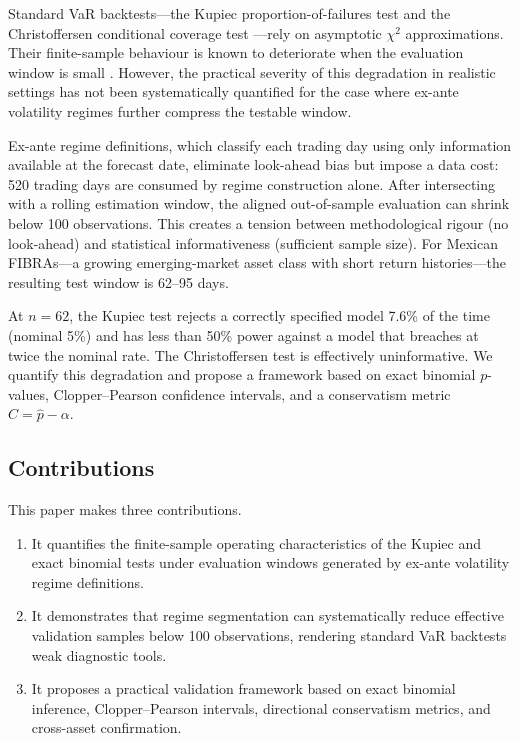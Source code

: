 \documentclass[12pt,a4paper]{article}
\begin{document}
Standard VaR backtests---the Kupiec proportion-of-failures test \cite{kupiec1995techniques} and the Christoffersen conditional coverage test \cite{christoffersen1998evaluating}---rely on asymptotic $\chi^2$ approximations. Their finite-sample behaviour is known to deteriorate when the evaluation window is small \cite{escanciano2010backtesting}. However, the practical severity of this degradation in realistic settings has not been systematically quantified for the case where ex-ante volatility regimes further compress the testable window.

Ex-ante regime definitions, which classify each trading day using only information available at the forecast date, eliminate look-ahead bias but impose a data cost: 520 trading days are consumed by regime construction alone. After intersecting with a rolling estimation window, the aligned out-of-sample evaluation can shrink below 100 observations. This creates a tension between methodological rigour (no look-ahead) and statistical informativeness (sufficient sample size). For Mexican FIBRAs---a growing emerging-market asset class with short return histories---the resulting test window is 62--95 days.

At $n = 62$, the Kupiec test rejects a correctly specified model 7.6\% of the time (nominal 5\%) and has less than 50\% power against a model that breaches at twice the nominal rate. The Christoffersen test is effectively uninformative. We quantify this degradation and propose a framework based on exact binomial $p$-values, Clopper--Pearson confidence intervals, and a conservatism metric $C = \hat{p} - \alpha$.

\subsection{Contributions}

This paper makes three contributions.

\begin{enumerate}
    \item It quantifies the finite-sample operating characteristics of the Kupiec and exact binomial tests under evaluation windows generated by ex-ante volatility regime definitions.
    \item It demonstrates that regime segmentation can systematically reduce effective validation samples below 100 observations, rendering standard VaR backtests weak diagnostic tools.
    \item It proposes a practical validation framework based on exact binomial inference, Clopper--Pearson intervals, directional conservatism metrics, and cross-asset confirmation.
\end{enumerate}
\end{document}
